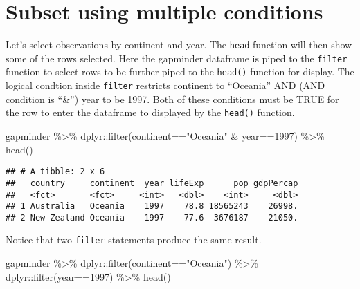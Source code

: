 \documentclass[
]{book}
\newenvironment{Shaded}{\begin{snugshade}}{\end{snugshade}}
\newcommand{\DecValTok}[1]{\textcolor[rgb]{0.00,0.00,0.81}{#1}}
\newcommand{\FunctionTok}[1]{\textcolor[rgb]{0.00,0.00,0.00}{#1}}
\newcommand{\NormalTok}[1]{#1}
\newcommand{\SpecialCharTok}[1]{\textcolor[rgb]{0.00,0.00,0.00}{#1}}
\newcommand{\StringTok}[1]{\textcolor[rgb]{0.31,0.60,0.02}{#1}}
\begin{document}
\hypertarget{subset-using-multiple-conditions}{%
\section{Subset using multiple conditions}\label{subset-using-multiple-conditions}}

Let's select observations by continent and year. The \texttt{head} function will then show some of the rows selected. Here the gapminder dataframe is piped to the \texttt{filter} function to select rows to be further piped to the \texttt{head()} function for display. The logical condtion inside \texttt{filter} restricts continent to ``Oceania'' AND (AND condition is ``\&'') year to be 1997. Both of these conditions must be TRUE for the row to enter the dataframe to displayed by the \texttt{head()} function.

\begin{Shaded}
\begin{Highlighting}[]
\NormalTok{gapminder }\SpecialCharTok{\%\textgreater{}\%} 
\NormalTok{  dplyr}\SpecialCharTok{::}\FunctionTok{filter}\NormalTok{(continent}\SpecialCharTok{==}\StringTok{"Oceania"} \SpecialCharTok{\&}\NormalTok{ year}\SpecialCharTok{==}\DecValTok{1997}\NormalTok{) }\SpecialCharTok{\%\textgreater{}\%} 
  \FunctionTok{head}\NormalTok{()}
\end{Highlighting}
\end{Shaded}

\begin{verbatim}
## # A tibble: 2 x 6
##   country     continent  year lifeExp      pop gdpPercap
##   <fct>       <fct>     <int>   <dbl>    <int>     <dbl>
## 1 Australia   Oceania    1997    78.8 18565243    26998.
## 2 New Zealand Oceania    1997    77.6  3676187    21050.
\end{verbatim}

Notice that two \texttt{filter} statements produce the same result.

\begin{Shaded}
\begin{Highlighting}[]
\NormalTok{gapminder }\SpecialCharTok{\%\textgreater{}\%} 
\NormalTok{  dplyr}\SpecialCharTok{::}\FunctionTok{filter}\NormalTok{(continent}\SpecialCharTok{==}\StringTok{"Oceania"}\NormalTok{) }\SpecialCharTok{\%\textgreater{}\%} 
\NormalTok{  dplyr}\SpecialCharTok{::}\FunctionTok{filter}\NormalTok{(year}\SpecialCharTok{==}\DecValTok{1997}\NormalTok{) }\SpecialCharTok{\%\textgreater{}\%}
  \FunctionTok{head}\NormalTok{()}
\end{Highlighting}
\end{Shaded}
\end{document}
